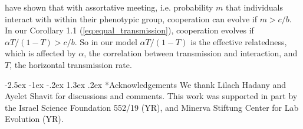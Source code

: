 \documentclass[12pt]{extarticle}
\makeatletter
\renewcommand\section{\@startsection {section}{1}{\z@}%
     {-2.5ex \@plus -1ex \@minus -.2ex}%
     {1.3ex \@plus.2ex}%
    {\Large\bfseries}}
\makeatother
\begin{document}
{\citet{Eshel1982} have shown that with assortative meeting, i.e. probability $m$ that individuals interact with within their phenotypic group, cooperation can evolve if $m > c/b$.
In our Corollary 1.1 (\autoref{eq:equal_transmission}), cooperation evolves if $\alpha T / (1-T) > c/b$. So in our model $\alpha T/(1-T)$ is the effective relatedness, which is affected by $\alpha$, the correlation between transmission and interaction, and $T$, the horizontal transmission rate.





\pagebreak
{\small
\section*{Acknowledgements}
We thank Lilach Hadany and Ayelet Shavit for discussions and comments.
This work was supported in part by
the Israel Science Foundation 552/19 (YR),
and Minerva Stiftung Center for Lab Evolution (YR).
}


\begin{appendices}
\renewcommand{\theequation}{\thesection\arabic{equation}}


\end{appendices}}
\end{document}
